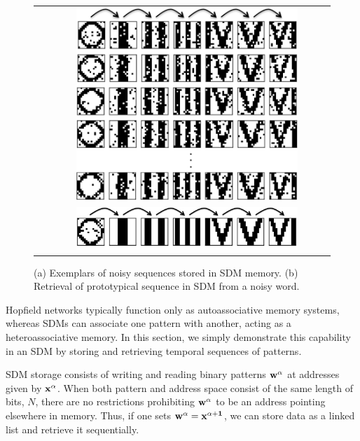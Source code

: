 \documentclass[10pt,letterpaper]{article}
\begin{document}
\begin{figure}[t!]
  \begin{center}
    \begin{tabular}{ l c }
      \raisebox{4.1in}{(a)} &
      \includegraphics[width=0.8\textwidth]{./figures/exemplarStoredSequences.png} \vspace{25bp} 
      \\
      \raisebox{.6in}{(b)} &
      \includegraphics[width=0.8\textwidth]{./figures/prototypeRetrievedSequence.png} 
    \end{tabular}
    \caption{(a) Exemplars of noisy sequences stored in SDM
      memory. (b) Retrieval of prototypical sequence in SDM from a
      noisy word.}
    \label{sequences}
  \end{center}
\end{figure}

Hopfield networks typically function only as autoassociative memory systems, whereas SDMs can associate one pattern with another, acting as a heteroassociative memory. In this section, we simply demonstrate this capability in an SDM by storing and retrieving temporal sequences of patterns.

SDM storage consists of writing and reading binary patterns $\bf{w}^{\alpha}$ at addresses given by $\bf{x}^{\alpha}$. When both pattern and address space consist of the same length of bits, $N$, there are no restrictions prohibiting $\bf{w}^{\alpha}$ to be an address pointing elsewhere in memory. Thus, if one sets $\bf{w}^{\alpha} = \bf{x}^{\alpha+1}$, we can store data as a linked list and retrieve it sequentially.
\end{document}

